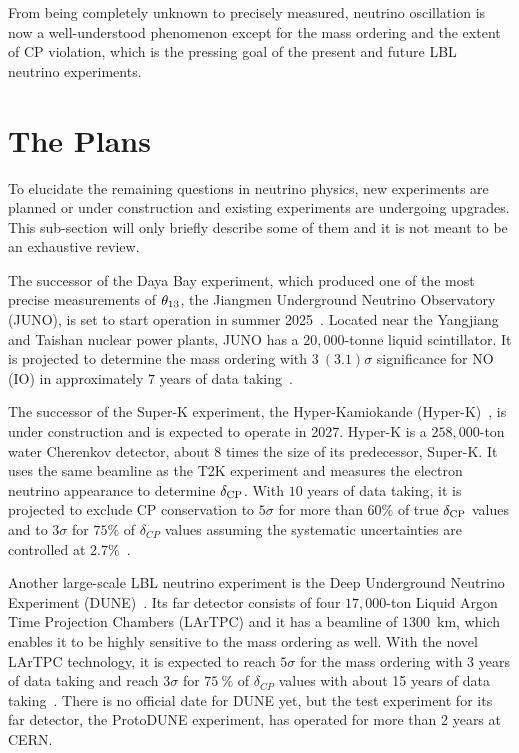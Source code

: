 From being completely unknown to precisely measured, neutrino oscillation is now a well-understood phenomenon except for the mass ordering and the extent of CP violation, which is the pressing goal of the present and future LBL neutrino experiments.
 
\section{The Plans}
To elucidate the remaining questions in neutrino physics, new experiments are planned or under construction and existing experiments are undergoing upgrades.
This sub-section will only briefly describe some of them and it is not meant to be an exhaustive review.

The successor of the Daya Bay experiment, which produced one of the most precise measurements of $\theta_{13}$, the Jiangmen Underground Neutrino Observatory (JUNO), is set to start operation in summer 2025~\cite{ScienceNews2025}.
Located near the Yangjiang and Taishan nuclear power plants, JUNO has a $20,000$-tonne liquid scintillator.
It is projected to determine the mass ordering with $3~(3.1)\sigma$ significance for NO (IO) in approximately $7$ years of data taking~\cite{Paoloni:2024atc}.

The successor of the Super-K experiment, the Hyper-Kamiokande (Hyper-K)~\cite{Hyper-Kamiokande:2018ofw}, is under construction and is expected to operate in 2027.
Hyper-K is a $258,000$-ton water Cherenkov detector, about $8$ times the size of its predecessor, Super-K.
It uses the same beamline as the T2K experiment and measures the electron neutrino appearance to determine $\delta_\textrm{CP}$.
With $10$ years of data taking, it is projected to exclude CP conservation to $5\sigma$ for more than $60\%$ of true $\delta_\textrm{CP}$ values and to $3\sigma$ for $75\%$ of $\delta_{CP}$ values assuming the systematic uncertainties are controlled at $2.7\%$~\cite{Jesus-Valls:2024ady}.

Another large-scale LBL neutrino experiment is the Deep Underground Neutrino Experiment (DUNE)~\cite{DUNE:2016hlj,DUNE:2015lol,DUNE:2016evb,DUNE:2016rla,DUNE:2021tad}.
Its far detector consists of four $17,000$-ton Liquid Argon Time Projection Chambers (LArTPC) and it has a beamline of $1300$~km, which enables it to be highly sensitive to the mass ordering as well.
With the novel LArTPC technology, it is expected to reach $5\sigma$ for the mass ordering with 3 years of data taking and reach $3\sigma$ for $75~\%$ of $\delta_{CP}$ values with about 15 years of data taking~\cite{Gil-Botella:2024duf}.
There is no official date for DUNE yet, but the test experiment for its far detector, the ProtoDUNE experiment, has operated for more than 2 years at CERN.

